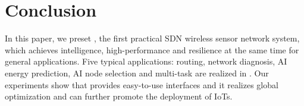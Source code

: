 \section{Conclusion}
\label{Con}

In this paper, we preset {\sdn}, the first practical SDN 
wireless sensor network system,
which achieves intelligence, high-performance and 
resilience at the same time for general applications. 
Five typical applications: routing, network diagnosis, AI energy prediction, 
AI node selection and multi-task are realized in {\sdn}.
%
Our experiments show that {\sdn} 
%
{\sdn} provides easy-to-use interfaces 
and it realizes global optimization and 
can further promote the deployment of IoTs.

